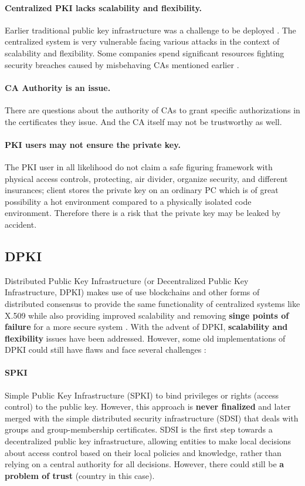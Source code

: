 \documentclass[lang=en]{sjtuarticle}
\begin{document}
\paragraph{Centralized PKI lacks scalability and flexibility.} Earlier
traditional public key infrastructure was a challenge to be deployed \cite{Gupta2023}.  The centralized system is very vulnerable facing various attacks in the context of scalability and flexibility. Some companies spend significant resources fighting security breaches caused
by misbehaving CAs mentioned earlier \cite{dpki}.

\paragraph{CA Authority is an issue.} There are questions about the authority of CAs to grant specific
authorizations in the certificates they issue. And the CA itself may not be trustworthy as well.

\paragraph{PKI users may not ensure the private key.} The PKI user in all likelihood
do not claim a safe figuring framework with physical access controls, protecting,
air divider, organize security, and different insurances; client stores the private key
on an ordinary PC which is of great possibility a hot environment compared to a physically isolated code environment. Therefore there is a risk that the private key may be leaked by accident.


\subsection{DPKI}

Distributed Public Key Infrastructure (or Decentralized Public Key Infrastructure, DPKI) makes use of use blockchains and other forms of distributed consensus to provide the same functionality
of centralized systems like X.509 while also providing improved scalability and removing \textbf{singe points of failure} for a more secure system \cite{dpkisota}. With the advent of DPKI, \textbf{scalability and flexibility} issues have been addressed.
However, some old implementations of DPKI could still have flaws and face several challenges \cite{dumitrescu2024failures}:

\paragraph{SPKI} Simple Public Key Infrastructure (SPKI) \cite{Ellison1999} to bind privileges or rights (access control) to the public key.  However,
this approach is \textbf{never finalized} and later merged with the simple distributed
security infrastructure (SDSI) \cite{sdsi} that deals with groups and group-membership
certificates. SDSI is the first step towards
a decentralized public key infrastructure, allowing entities
to make local decisions about access control based on their
local policies and knowledge, rather than relying on a central
authority for all decisions. However, there could still be \textbf{a problem of trust} (country in this case).
\end{document}
